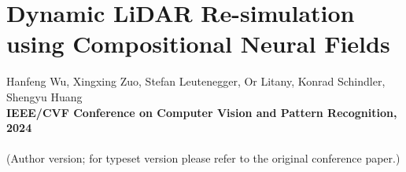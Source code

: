 \chapter[Dynamic LiDAR Re-simulation using Compositional Neural Fields]{Dynamic LiDAR Re-simulation using Compositional Neural Fields}
\label{chap:cvpr24}

Hanfeng Wu, Xingxing Zuo, Stefan Leutenegger, Or Litany, Konrad Schindler, Shengyu Huang \\
\textbf{IEEE/CVF Conference on Computer Vision and Pattern Recognition, 2024}\\
\\
(Author version; for typeset version please refer to the original conference paper.)\\

\providecommand{\subdir}{.}
\graphicspath{{\subdir/}}


\newpage








\clearpage
